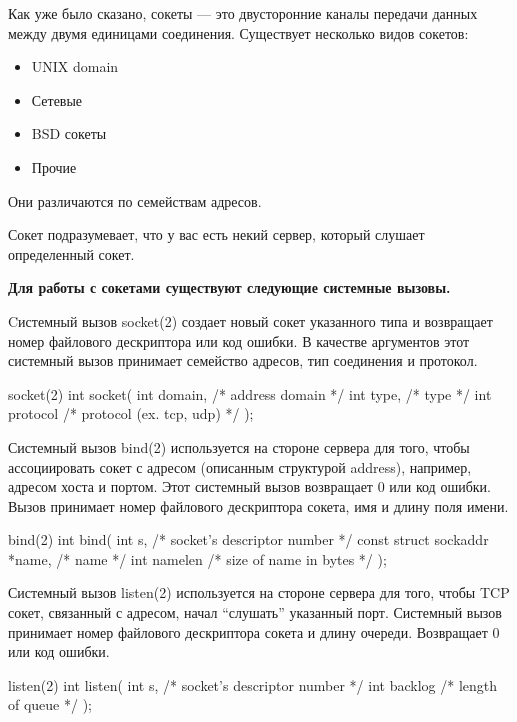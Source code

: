 Как уже было сказано, сокеты --- это двусторонние каналы передачи данных между двумя единицами соединения. Существует несколько видов сокетов:

\begin{itemize}
	\item UNIX domain 
	\item Сетевые 
	\item BSD сокеты 
	\item Прочие
\end{itemize}

Они различаются по семействам адресов. 

Сокет подразумевает, что у вас есть некий сервер, который слушает определенный сокет.


\textbf{Для работы с сокетами существуют следующие системные вызовы.}

Cистемный вызов socket(2) создает новый сокет указанного типа и возвращает номер файлового дескриптора или код ошибки. В качестве аргументов этот системный вызов принимает семейство адресов, тип соединения и протокол.

\begin{CCode}{socket(2)}
	int socket( 
		int domain, 	/* address domain */ 
		int type,		/* type */ 
		int protocol	/* protocol (ex. tcp, udp) */ 
	); \end{CCode}

Системный вызов bind(2) используется на стороне сервера для того, чтобы ассоциировать сокет с адресом (описанным структурой address), например, адресом хоста и портом. Этот системный вызов возвращает 0 или код ошибки. Вызов принимает номер файлового дескриптора сокета, имя и длину поля имени.

\begin{CCode}{bind(2)}
	int bind( 
		int s, 							/* socket's descriptor number */ 
		const struct sockaddr *name, 	/* name */ 
		int namelen 					/* size of name in bytes */ 
	); \end{CCode}

Системный вызов listen(2) используется на стороне сервера для того, чтобы TCP сокет, связанный с адресом, начал “слушать” указанный порт. Системный вызов принимает номер файлового дескриптора сокета и длину очереди. Возвращает 0 или код ошибки.

\begin{CCode}{listen(2)}
	int listen( 
		int s, 			/* socket's descriptor number */ 
		int backlog 	/* length of queue */ 
	); \end{CCode}


